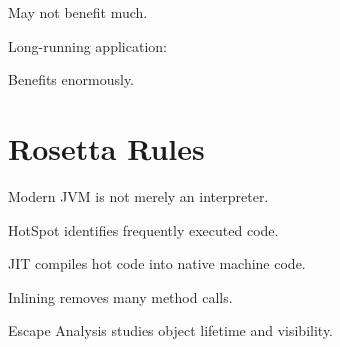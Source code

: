 \documentclass[11pt,a4paper]{book}
\begin{document}
May not benefit much.


Long-running application:


Benefits enormously.


\section{Rosetta Rules}

\begin{rosettarule}

Modern JVM is not merely an interpreter.

\end{rosettarule}


\begin{rosettarule}

HotSpot identifies frequently
executed code.

\end{rosettarule}


\begin{rosettarule}

JIT compiles hot code into
native machine code.

\end{rosettarule}


\begin{rosettarule}

Inlining removes many method calls.

\end{rosettarule}


\begin{rosettarule}

Escape Analysis studies object
lifetime and visibility.

\end{rosettarule}
\end{document}

